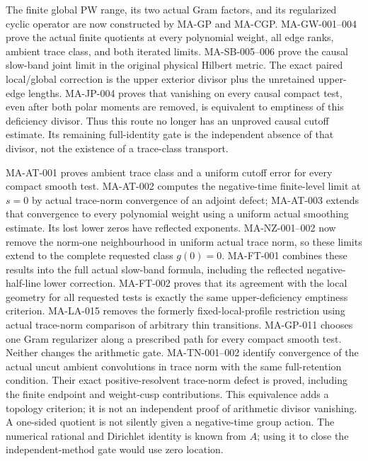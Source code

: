 \documentclass[11pt,a4paper]{article}
\begin{document}
The finite global PW range, its two actual Gram factors, and its
regularized cyclic operator are now constructed by MA-GP and
MA-CGP. MA-GW-001--004 prove the actual finite quotients at every
polynomial weight, all edge ranks, ambient trace class, and both
iterated limits. MA-SB-005--006 prove the causal slow-band joint
limit in the original physical Hilbert metric. The exact paired
local/global correction is the upper exterior divisor plus the
unretained upper-edge lengths. MA-JP-004 proves that vanishing
on every causal compact test, even after both polar moments are
removed, is equivalent to emptiness of this deficiency divisor.
Thus this route no longer has an unproved causal cutoff estimate.
Its remaining full-identity gate is the independent absence of
that divisor, not the existence of a trace-class transport.

MA-AT-001 proves ambient trace class and a uniform cutoff error
for every compact smooth test. MA-AT-002 computes the negative-time
finite-level limit at $s=0$ by actual trace-norm convergence of
an adjoint defect; MA-AT-003 extends that convergence to every
polynomial weight using a uniform actual smoothing estimate.
Its lost lower zeros have reflected exponents. MA-NZ-001--002
now remove the norm-one neighbourhood in uniform actual trace norm,
so these limits extend to the complete requested class $g(0)=0$.
MA-FT-001 combines these results into the full actual slow-band
formula, including the reflected negative-half-line lower correction.
MA-FT-002 proves that its agreement with the local geometry for all
requested tests is exactly the same upper-deficiency emptiness criterion.
MA-LA-015 removes the formerly fixed-local-profile restriction
using actual trace-norm comparison of arbitrary thin transitions.
MA-GP-011 chooses one Gram regularizer along a prescribed path
for every compact smooth test. Neither changes the arithmetic gate.
MA-TN-001--002 identify convergence of the actual uncut ambient
convolutions in trace norm with the same full-retention condition.
Their exact positive-resolvent trace-norm defect is proved,
including the finite endpoint and weight-cusp contributions.
This equivalence adds a topology criterion; it is not an
independent proof of arithmetic divisor vanishing.
A one-sided quotient is not silently given a negative-time group action.
The numerical rational and Dirichlet identity is known from $A$;
using it to close the independent-method gate would use zero location.
\end{document}
